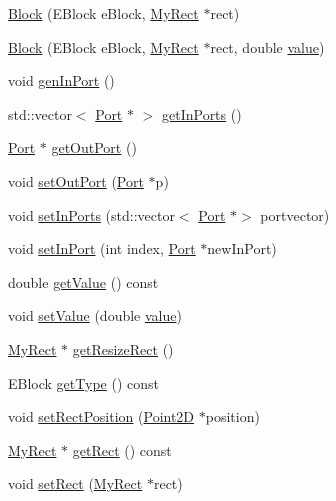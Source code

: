 \begin{DoxyCompactItemize}
\item 
\hyperlink{classBlock_a323497a43c8db217fce86704990008c9}{Block} (E\+Block e\+Block, \hyperlink{classMyRect}{My\+Rect} $\ast$rect)
\item 
\hyperlink{classBlock_a36a6f635930ffe1ba55af52236e911dd}{Block} (E\+Block e\+Block, \hyperlink{classMyRect}{My\+Rect} $\ast$rect, double \hyperlink{classBlock_afb64e6479c44387ece15c0f8d635236f}{value})
\item 
void \hyperlink{classBlock_a1a02b48229dc2df1d58b1c7a202f3e5e}{gen\+In\+Port} ()
\item 
std\+::vector$<$ \hyperlink{classPort}{Port} $\ast$ $>$ \hyperlink{classBlock_af10d358559032e920b7b8ad25c113b69}{get\+In\+Ports} ()
\item 
\hyperlink{classPort}{Port} $\ast$ \hyperlink{classBlock_a897dd6edfbdec3930d764aa39f0d3de8}{get\+Out\+Port} ()
\item 
void \hyperlink{classBlock_a82671bfde9a0d710c72ef5004fdb4179}{set\+Out\+Port} (\hyperlink{classPort}{Port} $\ast$p)
\item 
void \hyperlink{classBlock_aa67c1224df9015c055fa5523dfa67f52}{set\+In\+Ports} (std\+::vector$<$ \hyperlink{classPort}{Port} $\ast$$>$ portvector)
\item 
void \hyperlink{classBlock_aa24819f99f922d0b2cba3d12775974e0}{set\+In\+Port} (int index, \hyperlink{classPort}{Port} $\ast$new\+In\+Port)
\item 
double \hyperlink{classBlock_a613dd5c447f2a2dccebdaba7c2b4b74c}{get\+Value} () const
\item 
void \hyperlink{classBlock_acabb5bf7f41bc16338b4efde5a760703}{set\+Value} (double \hyperlink{classBlock_afb64e6479c44387ece15c0f8d635236f}{value})
\item 
\hyperlink{classMyRect}{My\+Rect} $\ast$ \hyperlink{classBlock_ad4c55f893fad7eec6e2ecaa9e6bec6da}{get\+Resize\+Rect} ()
\item 
E\+Block \hyperlink{classBlock_aefadce64bb60ab2e12a23bce510b74da}{get\+Type} () const
\item 
void \hyperlink{classBlock_a939528c280e4d7f516422f85bb22c2d2}{set\+Rect\+Position} (\hyperlink{classPoint2D}{Point2D} $\ast$position)
\item 
\hyperlink{classMyRect}{My\+Rect} $\ast$ \hyperlink{classBlock_a396f46a4f7592ffdf4d168be2e79ee52}{get\+Rect} () const
\item 
void \hyperlink{classBlock_a0ee328fa6748cad1232dd0803710dbf0}{set\+Rect} (\hyperlink{classMyRect}{My\+Rect} $\ast$rect)
$$
\end{DoxyCompactItemize}
